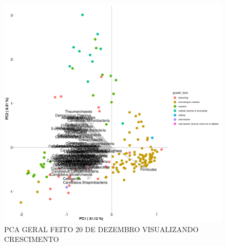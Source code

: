 \documentclass[12pt, a4paper]{report}
\begin{document}
\begin{figure}[H]
	\centering
	\includegraphics[scale=0.4]{figures/PCA_growth_157_corais_2018_12_20.png}
	\caption{PCA GERAL FEITO 20 DE DEZEMBRO VISUALIZANDO CRESCIMENTO}
	\label{fig: PCAGERALFEITODIA20DEDEZEMBROVISUALIZANDOCATEGORIACRESCIMENTO}
\end{figure}
\end{document}
